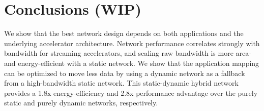 \chapter{Conclusions (WIP)}

We show that the best network design depends on both applications and the underlying accelerator architecture.
Network performance correlates strongly with bandwidth for streaming accelerators, and scaling raw bandwidth is more area- and energy-efficient with a static network.
We show that the application mapping can be optimized to move less data by using a dynamic network as a fallback from a high-bandwidth static network.
This static-dynamic hybrid network provides a 1.8x energy-efficiency and
2.8x performance advantage over the purely static and purely dynamic networks, respectively.


